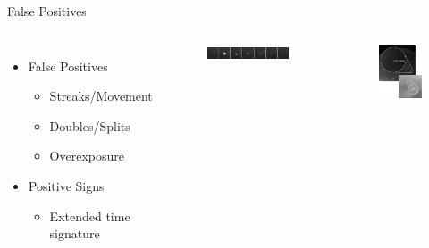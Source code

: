 \documentclass[pdf]{beamer}
\begin{document}
 \begin{frame}{False Positives}
   \begin{columns}
	 \begin{itemize}
	   \item False Positives
		 \begin{itemize}
		   \item Streaks/Movement
		   \item Doubles/Splits
		   \item Overexposure
		 \end{itemize}
	   \item Positive Signs
		 \begin{itemize}
		   \item Extended time signature
		 \end{itemize}
	 \end{itemize}
	 \begin{figure}[ht!]
	   \centering
	   \includegraphics[width=1.45\textwidth]{Images/ExtImpSeq.pdf}
	 \end{figure}
	 \begin{figure}[ht!]
	   \centering
	   \includegraphics[width=.8\textwidth]{Images/false_positives.png}
	 \end{figure}
   \end{columns}
 \end{frame}
\end{document}
